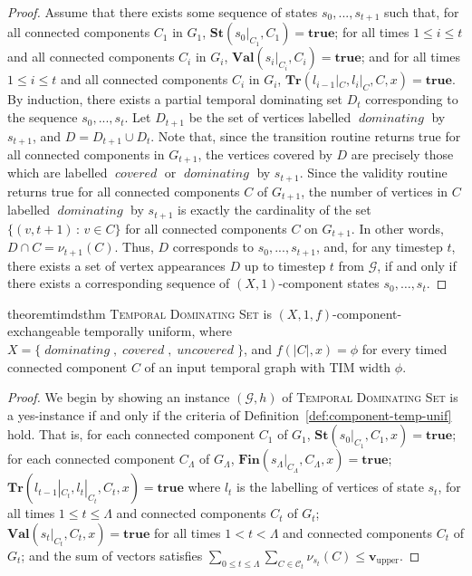 \documentclass[a4paper,UKenglish,cleveref, autoref, thm-restate]{lipics-v2021} %
\DeclareMathOperator{\covered}{\textit{covered}}
\DeclareMathOperator{\uncovered}{\textit{uncovered}}
\DeclareMathOperator{\dominating}{\textit{dominating}}
\begin{document}
\begin{toappendix}
\begin{proof}
     Assume that there exists some sequence of states $s_0, ..., s_{t+1}$ such that, for all connected components $C_1$ in $G_1$, $\textbf{St}(s_0|_{C_1}, C_1)=\textbf{true}$; for all times $1\leq i\leq t$ and all connected components $C_{i}$ in $G_{i}$, $\textbf{Val}(s_{i}|_{C_{i}}, C_{i})=\textbf{true}$; and for all times $1\leq i\leq t$ and all connected components $C_{i}$ in $G_{i}$, $\textbf{Tr}(l_{i-1}|_C, l_i|_C, C,x)=\textbf{true}$. By induction, there exists a partial temporal dominating set $D_{t}$ corresponding to the sequence $s_0, ..., s_{t}$. Let $D_{t+1}$ be the set of vertices labelled $\dominating$ by $s_{t+1}$, and $D=D_{t+1}\cup D_t$. Note that, since the transition routine returns true for all connected components in $G_{t+1}$, the vertices covered by $D$ are precisely those which are labelled $\covered$ or $\dominating$ by $s_{t+1}$. Since the validity routine returns true for all connected components $C$ of $G_{t+1}$, the number of vertices in $C$ labelled $\dominating$ by $s_{t+1}$ is exactly the cardinality of the set $\{(v,t+1)\,:\, v\in C\}$ for all connected components $C$ on $G_{t+1}$. In other words, $D\cap C=\nu_{t+1}(C)$. Thus, $D$ corresponds to $s_0, ..., s_{t+1}$, and, for any timestep $t$, there exists a set of vertex appearances $D$ up to timestep $t$ from $\mathcal{G}$, if and only if there exists a corresponding sequence of $(X,1)$-component states $s_0, \ldots, s_t$.
 \end{proof}
 \begin{restatable}{theorem}{timdsthm}
     \textsc{Temporal Dominating Set} is $(X,1,f)$-component-exchangeable temporally uniform, where $X=\{\dominating,\covered,\uncovered\}$, and $f(|C|,x)=\phi$ for every timed connected component $C$ of an input temporal graph with TIM width $\phi$.
 \end{restatable}
 \begin{proof}
     We begin by showing an instance $(\mathcal{G},h)$ of \textsc{Temporal Dominating Set} is a yes-instance if and only if the criteria of Definition~\ref{def:component-temp-unif} hold. That is, for each connected component $C_1$ of $G_1$, $\textbf{St}(s_0|_{C_1},C_1,x)=\textbf{true}$; for each connected component $C_{\Lambda}$ of $G_{\Lambda}$, $\textbf{Fin}(s_{\Lambda}|_{C_{\Lambda}},C_{\Lambda},x)=\textbf{true}$; $\textbf{Tr}(l_{t-1}|_{C_t}, l_t|_{C_t}, C_t,x)=\textbf{true}$ where $l_t$ is the labelling of vertices of state $s_t$, for all times $1 \leq t \leq \Lambda$ and connected components $C_t$ of $G_t$; $\textbf{Val}(s_t|_{C_t}, C_t,x)=\textbf{true}$ for all times $1 < t < \Lambda$ and connected components $C_t$ of $G_t$; and the sum of vectors satisfies $\sum_{0\leq t\leq \Lambda} \sum_{C \in\mathcal{C}_t}\nu_{s_t} (C)\leq \textbf{v}_{\text{upper}}$.


\end{proof}
\end{toappendix}
\end{document}
